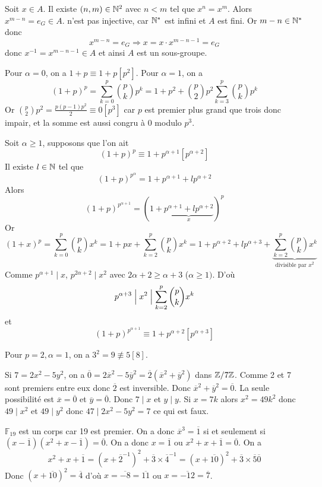 \begin{solution}
	Soit $x\in A$. Il existe $(n,m)\in\mathbb{N}^{2}$ avec $n<m$ tel que $x^{n}=x^{m}$. Alors $x^{m-n}=e_{G}\in A$.
	n'est pas injective, car $\mathbb{N}^{*}$ est infini et $A$ est fini. Or $m-n\in\mathbb{N}^{*}$ donc
	$$x^{m-n}=e_{G}\Rightarrow x=x\cdot x^{m-n-1}=e_{G}$$
	donc $x^{-1}=x^{m-n-1}\in A$ et ainsi $A$ est un sous-groupe.
\end{solution}

\begin{solution}
	Pour $\alpha=0$, on a $1+p\equiv 1+p[p^{2}]$. Pour $\alpha=1$, on a 
	$$(1+p)^{p}=\sum_{k=0}^{p}\binom{p}{k}p^{k}=1+p^{2}+\binom{p}{2}p^{2}\sum_{k=3}^{p}\binom{p}{k}p^{k}$$
	Or $\binom{p}{2}p^{2}=\frac{p(p-1)p^{2}}{2}\equiv0[p^{3}]$ car $p$ est premier plus grand que trois donc impair, et la somme est aussi congru à 0 modulo $p^{3}$.

	Soit $\alpha\geqslant1$, supposons que l'on ait 
	$$(1+p)^{p}\equiv 1+p^{\alpha+1}[p^{\alpha+2}]$$
	Il existe $l\in\mathbb{N}$ tel que 
	$$(1+p)^{p^{\alpha}}=1+p^{\alpha+1}+lp^{\alpha+2}$$
	Alors 
	$$(1+p)^{p^{\alpha+1}}=(1+\underbrace{p^{\alpha+1}+lp^{\alpha+2}}_{x})^{p}$$
	Or
	$$(1+x)^{p}=\sum_{k=0}^{p}\binom{p}{k}x^{k}=1+px+\sum_{k=2}^{p}\binom{p}{k}x^{k}=1+p^{\alpha+2}+lp^{\alpha+3}+\underbrace{\sum_{k=2}^{p}\binom{p}{k}x^{k}}_{\text{divisible par }x^{2}}$$
	Comme $p^{\alpha+1}\mid x$, $p^{2\alpha+2}\mid x^{2}$ avec $2\alpha+2\geqslant\alpha+3$ ($\alpha\geqslant1)$. D'où 
	$$p^{\alpha+3}\Bigm| x^{2}\Bigm|\sum_{k=2}^{p}\binom{p}{k}x^{k}$$
	et
	$$(1+p)^{p^{\alpha+1}}\equiv1+p^{\alpha+2}[p^{\alpha+3}]$$
\end{solution}

\begin{remark}
	Pour $p=2,\alpha=1$, on a $3^{2}=9\not\equiv 5[8]$.
\end{remark}

\begin{solution}
	Si $7=2x^{2}-5y^{2}$, on a $\overline{0}=2\overline{x}^{2}-5\overline{y}^{2}=\overline{2}(\overline{x}^{2}+\overline{y}^{2})$ dans $\mathbb{Z}/7\mathbb{Z}$. Comme 2 et 7 sont premiers entre eux donc $\overline{2}$ est inversible. Donc $\overline{x}^{2}+\overline{y}^{2}=\overline{0}$. La seule possibilité est $\overline{x}=\overline{0}$ et $\overline{y}=\overline{0}$. Donc $7\mid x$ et $y\mid y$. Si $x=7k$ alors $x^{2}=49k^{2}$ donc $49\mid x^{2}$ et $49\mid y^{2}$ donc $47\mid 2x^{2}-5y^{2}=7$ ce qui est faux.
\end{solution}

\begin{solution}
	$\mathbb{F}_{19}$ est un corps car 19 est premier. On a donc $\overline{x}^{3}=\overline{1}$ si et seulement si $(x-\overline{1})(x^{2}+x-\overline{1})=\overline{0}$. On a donc $x=\overline{1}$ ou $x^{2}+x+\overline{1}=\overline{0}$.
	On a 
	$$x^{2}+x+\overline{1}=(x+\overline{2}^{-1})^{2}+\overline{3}\times\overline{4}^{-1}=(x+\overline{10})^{2}+\overline{3}\times\overline{5}\overline{0}$$
	Donc $(x+\overline{10})^{2}=\overline{4}$ d'où $x=\overline{-8}=\overline{11}$ ou $x=\overline{-12}=\overline{7}$.
\end{solution}

